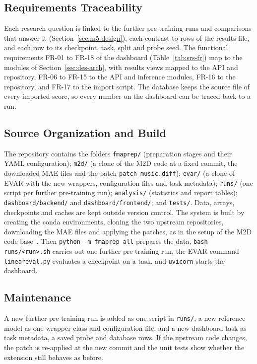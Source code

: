 \documentclass{FastFyp}
\begin{document}
\subsection{Requirements Traceability}
Each research question is linked to the further pre-training runs and comparisons that answer it (Section~\ref{sec:m5-design}), each contrast to rows of the results file, and each row to its checkpoint, task, split and probe seed. The functional requirements FR-01 to FR-18 of the dashboard (Table~\ref{tab:srs-fr}) map to the modules of Section~\ref{sec:des-arch}, with results views mapped to the API and repository, FR-06 to FR-15 to the API and inference modules, FR-16 to the repository, and FR-17 to the import script. The database keeps the source file of every imported score, so every number on the dashboard can be traced back to a run.

\subsection{Source Organization and Build}
{\sloppy The repository contains the folders \texttt{fmaprep/} (preparation stages and their YAML configuration); \texttt{m2d/} (a clone of the M2D code at a fixed commit, the downloaded MAE files and the patch \texttt{patch\_music.diff}); \texttt{evar/} (a clone of EVAR with the new wrappers, configuration files and task metadata); \texttt{runs/} (one script per further pre-training run); \texttt{analysis/} (statistics and report tables); \texttt{dashboard/backend/} and \texttt{dashboard/frontend/}; and \texttt{tests/}. Data, arrays, checkpoints and caches are kept outside version control. The system is built by creating the conda environments, cloning the two upstream repositories, downloading the MAE files and applying the patches, as in the setup of the M2D code base~\cite{ref:M2DGit}. Then \texttt{python -m fmaprep all} prepares the data, \texttt{bash runs/<run>.sh} carries out one further pre-training run, the EVAR command \texttt{lineareval.py} evaluates a checkpoint on a task, and \texttt{uvicorn} starts the dashboard.\par}

\subsection{Maintenance}
A new further pre-training run is added as one script in \texttt{runs/}, a new reference model as one wrapper class and configuration file, and a new dashboard task as task metadata, a saved probe and database rows. If the upstream code changes, the patch is re-applied at the new commit and the unit tests show whether the extension still behaves as before.
\end{document}
